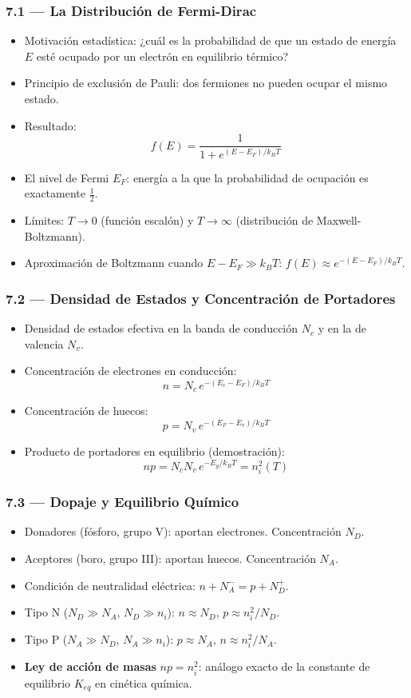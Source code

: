 \documentclass[11pt, letterpaper]{article}
\begin{document}
\subsubsection{7.1 — La Distribución de Fermi-Dirac}
\begin{itemize}
  \item Motivación estadística: ¿cuál es la probabilidad de que un estado de energía $E$ esté ocupado por un electrón en equilibrio térmico?
  \item Principio de exclusión de Pauli: dos fermiones no pueden ocupar el mismo estado.
  \item Resultado:
    \[f(E)=\frac{1}{1+e^{(E-E_F)/k_BT}}\]
  \item El nivel de Fermi $E_F$: energía a la que la probabilidad de ocupación es exactamente $\frac{1}{2}$.
  \item Límites: $T\to 0$ (función escalón) y $T\to\infty$ (distribución de Maxwell-Boltzmann).
  \item Aproximación de Boltzmann cuando $E-E_F\gg k_BT$: $f(E)\approx e^{-(E-E_F)/k_BT}$.
\end{itemize}

\subsubsection{7.2 — Densidad de Estados y Concentración de Portadores}
\begin{itemize}
  \item Densidad de estados efectiva en la banda de conducción $N_c$ y en la de valencia $N_v$.
  \item Concentración de electrones en conducción:
    \[n = N_c\,e^{-(E_c-E_F)/k_BT}\]
  \item Concentración de huecos:
    \[p = N_v\,e^{-(E_F-E_v)/k_BT}\]
  \item Producto de portadores en equilibrio (demostración):
    \[np = N_c N_v\,e^{-E_g/k_BT} = n_i^2(T)\]
\end{itemize}

\subsubsection{7.3 — Dopaje y Equilibrio Químico}
\begin{itemize}
  \item Donadores (fósforo, grupo V): aportan electrones. Concentración $N_D$.
  \item Aceptores (boro, grupo III): aportan huecos. Concentración $N_A$.
  \item Condición de neutralidad eléctrica: $n + N_A^- = p + N_D^+$.
  \item Tipo N ($N_D\gg N_A$, $N_D\gg n_i$): $n\approx N_D$, $p\approx n_i^2/N_D$.
  \item Tipo P ($N_A\gg N_D$, $N_A\gg n_i$): $p\approx N_A$, $n\approx n_i^2/N_A$.
  \item \textbf{Ley de acción de masas} $np=n_i^2$: análogo exacto de la constante de equilibrio $K_{eq}$ en cinética química.
\end{itemize}
\end{document}
